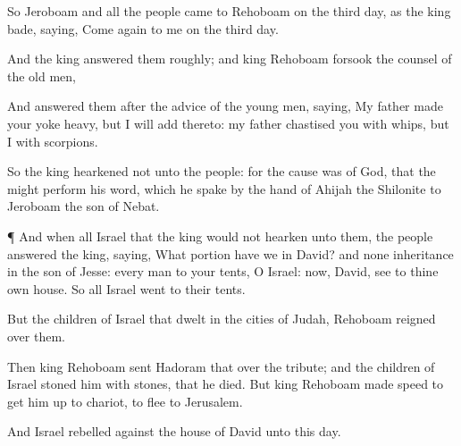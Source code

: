{\par }{\PP {}So
Jeroboam and all the
people
came to
Rehoboam on the
third
day, as the
king
bade,
saying, Come
again to me on the
third
day.

And the
king
answered them
roughly; and
king
Rehoboam
forsook the
counsel of the old
men,

And
answered them after the
advice of the young
men,
saying, My
father made your
yoke
heavy, but I will
add thereto: my
father
chastised you with
whips, but I
{} with
scorpions.

So the
king
hearkened not unto the
people: for the
cause was of
God, that the
{} might
perform his
word, which he
spake by the
hand of
Ahijah the
Shilonite to
Jeroboam the
son of
Nebat.


\par }{\PP {}¶ And when all
Israel
{} that the
king would not
hearken unto them, the
people
answered the
king,
saying, What
portion have we in
David? and
{} none
inheritance in the
son of
Jesse: every
man to your
tents, O
Israel:
{} now,
David,
see to thine own
house. So all
Israel
went to their
tents.

But
{} the
children of
Israel that
dwelt in the
cities of
Judah,
Rehoboam
reigned over them.

Then
king
Rehoboam
sent
Hadoram that
{} over the
tribute; and the
children of
Israel
stoned him with
stones, that he
died. But
king
Rehoboam made
speed to get him
up to
{}
chariot, to
flee to
Jerusalem.

And
Israel
rebelled against the
house of
David unto this
day.




\par }
